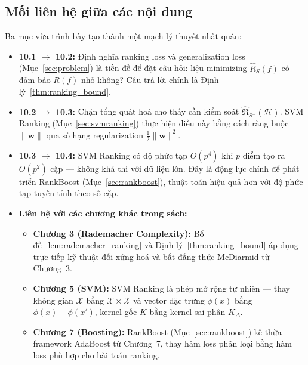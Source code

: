 \subsection{Mối liên hệ giữa các nội dung}
\label{sec:connections}

Ba mục vừa trình bày tạo thành một mạch lý thuyết nhất quán:

\begin{itemize}
  \item \textbf{10.1 $\to$ 10.2:} Định nghĩa ranking loss và 
  generalization loss (Mục~\ref{sec:problem}) là tiền đề để 
  đặt câu hỏi: liệu minimizing $\hat{R}_S(f)$ có đảm bảo 
  $R(f)$ nhỏ không? Câu trả lời chính là 
  Định lý~\ref{thm:ranking_bound}.

  \item \textbf{10.2 $\to$ 10.3:} Chặn tổng quát hoá cho thấy 
  cần kiểm soát $\hat{\mathfrak{R}}_{S^+}(\mathcal{H})$. 
  SVM Ranking (Mục~\ref{sec:svmranking}) thực hiện điều này 
  bằng cách ràng buộc $\|\mathbf{w}\|$ qua số hạng 
  regularization $\frac{1}{2}\|\mathbf{w}\|^2$.

  \item \textbf{10.3 $\to$ 10.4:} SVM Ranking có độ phức tạp 
  $O(p^4)$ khi $p$ điểm tạo ra $O(p^2)$ cặp — không khả thi 
  với dữ liệu lớn. Đây là động lực chính để phát triển 
  RankBoost (Mục~\ref{sec:rankboost}), thuật toán hiệu quả 
  hơn với độ phức tạp tuyến tính theo số cặp.

  \item \textbf{Liên hệ với các chương khác trong sách:}
  \begin{itemize}
    \item \textbf{Chương 3 (Rademacher Complexity):} 
    Bổ đề~\ref{lem:rademacher_ranking} và 
    Định lý~\ref{thm:ranking_bound} áp dụng trực tiếp kỹ 
    thuật đối xứng hoá và bất đẳng thức McDiarmid từ Chương~3.

    \item \textbf{Chương 5 (SVM):} SVM Ranking là phép mở 
    rộng tự nhiên — thay không gian $\mathcal{X}$ bằng 
    $\mathcal{X}\times\mathcal{X}$ và vector đặc trưng 
    $\phi(x)$ bằng $\phi(x)-\phi(x')$, kernel gốc $K$ 
    bằng kernel sai phân $K_\Delta$.

    \item \textbf{Chương 7 (Boosting):} RankBoost 
    (Mục~\ref{sec:rankboost}) kế thừa framework AdaBoost 
    từ Chương~7, thay hàm loss phân loại bằng hàm loss 
    phù hợp cho bài toán ranking.
  \end{itemize}
\end{itemize}